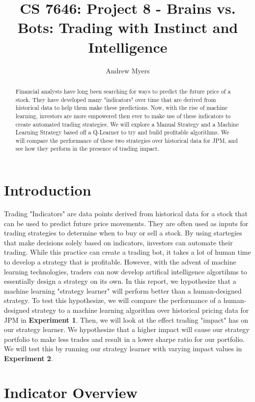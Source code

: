 \documentclass[
	letterpaper, %
]{jdf}
\author{Andrew Myers}
\title{CS 7646: Project 8 - Brains vs. Bots: Trading with Instinct and Intelligence}
\begin{document}

\maketitle

\begin{abstract}
	Financial analysts have long been searching for ways to predict the future price of a stock.
	They have developed many "indicators" over time that are derived from historical data to help them make these predictions.
	Now, with the rise of machine learning, investors are more empowered then ever to make use of these indicators to create automated trading strategies.
	We will explore a Manual Strategy and a Machine Learning Strategy based off a Q-Learner to try and build profitable algorithms.
	We will compare the performance of these two strategies over historical data for JPM, and see how they perform in the presence of trading impact.
\end{abstract}

\section{Introduction}
Trading "Indicators" are data points derived from historical data for a stock that can be used to predict future price movements.
They are often used as inputs for trading strategies to determine when to buy or sell a stock. 
By using startegies that make decisions solely based on indicators, investors can automate their trading.
While this practice can create a trading bot, it takes a lot of human time to develop a strategy that is profitable.
However, with the advent of machine learning technologies, traders can now develop artifical intelligence algortihms to essentially design a strategy on its own.
In this report, we hypothesize that a machine learning "strategy learner" will perform better than a human-designed strategy.
To test this hypothesize, we will compare the performance of a human-designed strategy to a machine learning algorithm over historical pricing data for JPM in \textbf{Experiment 1}.
Then, we will look at the effect trading "impact" has on our strategy learner.
We hypothesize that a higher impact will cause our strategy portfolio to make less trades and result in a lower sharpe ratio for our portfolio.
We will test this by running our strategy learner with varying impact values in \textbf{Experiment 2}.

\section{Indicator Overview}
\end{document}
